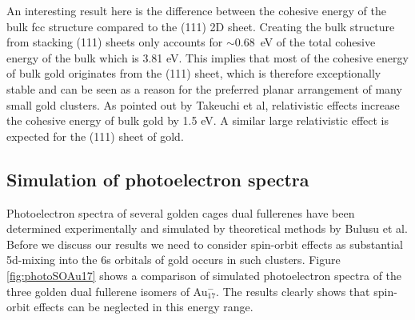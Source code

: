 An interesting result here is the difference between the cohesive energy of the
bulk fcc structure compared to the (111) 2D sheet. Creating the bulk structure
from stacking (111) sheets only accounts for $\sim$0.68~eV of the total
cohesive energy of the bulk which is 3.81 eV.\autocite{takeuchi_first-principles_1989} This implies
that most of the cohesive energy of bulk gold originates from the (111) sheet,
which is therefore exceptionally stable and can be seen as a reason for the
preferred planar arrangement of many small gold clusters.  As pointed out by
Takeuchi et al, relativistic effects increase the cohesive energy of bulk gold
by 1.5 eV.\autocite{takeuchi_first-principles_1989} A similar large relativistic effect is expected
for the (111) sheet of gold.

\subsection{Simulation of photoelectron spectra}

Photoelectron spectra of several golden cages dual fullerenes have been
determined experimentally and simulated by theoretical methods by Bulusu et
al.\autocite{Bulusu_Evidencehollowgolden_2006} Before we discuss our results we need to consider
spin-orbit effects as substantial 5d-mixing into the 6s orbitals of gold occurs
in such clusters. Figure \ref{fig:photoSOAu17} shows a comparison of simulated
photoelectron spectra of the three golden dual fullerene isomers of
Au$_{17}^-$. The results clearly shows that spin-orbit effects can be
neglected in this energy range.

